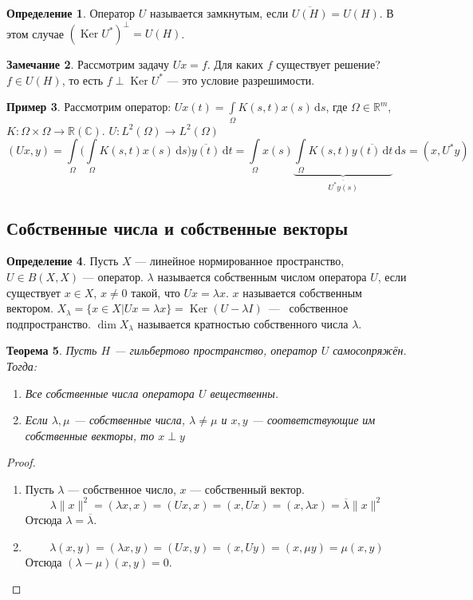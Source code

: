 \documentclass[11pt,openany,a4paper]{scrartcl}
\theoremstyle{plain}
\newtheorem{theorem}{Теорема}[subsection]
\theoremstyle{definition}
\newtheorem{definition}[theorem]{Определение}
\newtheorem{remark}[theorem]{Замечание}
\newtheorem{example}[theorem]{Пример}
\newcommand\mb{\mathbb}
\newcommand\real{\mb R}
\newcommand{\complex}{\mb C}
\newcommand{\dif}{\, \mathrm d}
\newcommand\ol{\overline}
\DeclareMathOperator{\Ker}{Ker}
\begin{document}
\begin{definition}
    Оператор $U$ называется замкнутым, если $\ol{U(H)} = U(H)$. В этом случае
    $(\Ker U^\ast)^\perp = U(H)$.
\end{definition}
\begin{remark}
    Рассмотрим задачу $Ux = f$. Для каких $f$ существует решение?
    $f \in U(H)$, то есть $f \perp \Ker U^\ast$ — это условие разрешимости.
\end{remark}

\begin{example}
    Рассмотрим оператор: $Ux(t) = \int\limits_{\Omega} K(s, t)x(s) \dif s$,
    где $\Omega \in \real^m$, $K: \Omega \times \Omega \to \real(\complex)$.
    $U: L^2(\Omega) \to L^2(\Omega)$
    $$
    (Ux, y) = \int\limits_\Omega \bigg(\int\limits_\Omega
    K(s, t) x(s) \dif s\bigg) \ol{y(t)} \dif t =
    \int\limits_\Omega x(s) \underbrace{\int\limits_\Omega
    K(s, t) \ol{y(t) \dif t}}_{\ol{U^\ast y(s)}} \dif s = (x, U^\ast y)
    $$
\end{example}

\subsection{Собственные числа и собственные векторы}

\begin{definition}
    Пусть $X$ — линейное нормированное пространство, $U \in B(X, X)$ — оператор.
    $\lambda$ называется собственным числом оператора $U$, если существует
    $x \in X$, $x \neq 0$ такой, что $Ux = \lambda x$. $x$ называется собственным
    вектором.
    $X_\lambda = \{x \in X \Big | Ux = \lambda x\} = \Ker(U - \lambda I)$~—~
    собственное подпространство. $\dim X_\lambda$ называется кратностью 
    собственного числа $\lambda$.
\end{definition}

\begin{theorem}
    Пусть $H$ — гильбертово пространство, оператор $U$ самосопряжён. Тогда:
    \begin{enumerate}
        \item Все собственные числа оператора $U$ вещественны.
        \item Если $\lambda, \mu$ — собственные числа, $\lambda \neq \mu$ и
        $x, y$ — соответствующие им собственные векторы, то $x \perp y$
    \end{enumerate}
\end{theorem}
\begin{proof}
\mbox{}
    \begin{enumerate}
        \item Пусть $\lambda$ — собственное число, $x$ — собственный вектор.
        $$
        \lambda\|x\|^2 = (\lambda x, x) = (Ux, x) = (x, Ux) = (x, \lambda x) =
        \ol{\lambda}\|x\|^2
        $$
        Отсюда $\lambda = \ol{\lambda}$.
        \item
        $$
        \lambda (x, y) = (\lambda x, y) = (Ux, y) = (x, Uy) = (x, \mu y) =
        \mu(x, y)
        $$
        Отсюда $(\lambda - \mu)(x, y) = 0$.
    \end{enumerate}
\end{proof}
\end{document}
